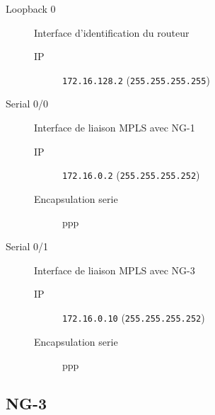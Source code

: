 	\begin{description}
		\item[Loopback 0] Interface d'identification du routeur
		\begin{description}
			\item[IP] \texttt{172.16.128.2} (\texttt{255.255.255.255})
		\end{description}

		\item[Serial 0/0] Interface de liaison MPLS avec NG-1
		\begin{description}
			\item[IP] \texttt{172.16.0.2} (\texttt{255.255.255.252})
			\item[Encapsulation serie] ppp
		\end{description}

		\item[Serial 0/1] Interface de liaison MPLS avec NG-3
		\begin{description}
			\item[IP] \texttt{172.16.0.10} (\texttt{255.255.255.252})
			\item[Encapsulation serie] ppp
		\end{description}

	\end{description}
	
	\clearpage
\subsection{NG-3}

